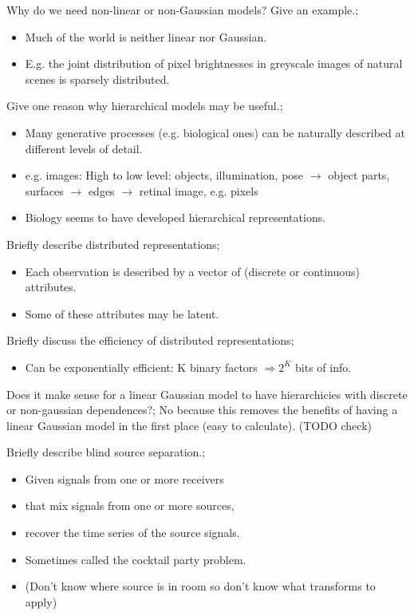 \documentclass{article}
\begin{document}

Why do we need non-linear or non-Gaussian models? Give an example.; \begin{itemize} \item Much of the world is neither linear nor Gaussian. \item E.g. the joint distribution of pixel brightnesses in greyscale images of natural scenes is sparsely distributed. \end{itemize}

Give one reason why hierarchical models may be useful.; \begin{itemize} \item Many generative processes (e.g. biological ones) can be naturally described at different levels of detail.  \item e.g. images: High to low level: objects, illumination, pose $\rightarrow$ object parts, surfaces $\rightarrow$ edges $\rightarrow$ retinal image, e.g. pixels \item Biology seems to have developed hierarchical representations. \end{itemize}

Briefly describe distributed representations; \begin{itemize} \item Each observation is described by a vector of (discrete or continuous) attributes. \item Some of these attributes may be latent. \end{itemize}

Briefly discuss the efficiency of distributed representations; \begin{itemize} \item Can be exponentially efficient: K binary factors $\Rightarrow 2^K$ bits of info. \end{itemize}

Does it make sense for a linear Gaussian model to have hierarchicies with discrete or non-gaussian dependences?; No because this removes the benefits of having a linear Gaussian model in the first place (easy to calculate). (TODO check)

Briefly describe blind source separation.; \begin{itemize} \item Given signals from one or more receivers  \item that mix signals from one or more sources, \item recover the time series of the source signals. \item Sometimes called the cocktail party problem. \item (Don't know where source is in room so don't know what transforms to apply) \end{itemize}
\end{document}
